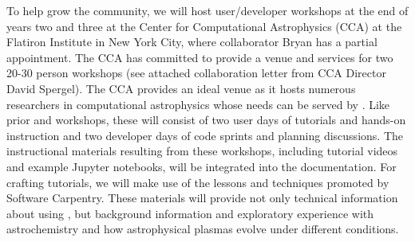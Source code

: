 To help grow the \grackle{} community, we will host user/developer
workshops at the end of years two and three at the Center for
Computational Astrophysics (CCA) at the Flatiron Institute in New York
City, where collaborator Bryan has a partial appointment.  The CCA has
committed to provide a venue and services for two 20-30 person
workshops (see attached collaboration letter from CCA Director David
Spergel).  The CCA provides an
ideal venue as it hosts numerous researchers in computational
astrophysics whose needs can be served by \grackle{}.  Like prior
\enzo{} and \yt{} workshops, these will consist of two user days of
tutorials and hands-on instruction and two developer days of code
sprints and planning discussions.  The instructional materials
resulting from these workshops, including tutorial videos and example
Jupyter notebooks, will be integrated into the \grackle{}
documentation. For crafting tutorials, we will make use of the lessons
and techniques promoted by Software
Carpentry\citep{software_carpentry}.  These materials will
provide not only technical information about using \grackle{}, but background
information and exploratory experience with astrochemistry and how
astrophysical plasmas evolve under different conditions.

